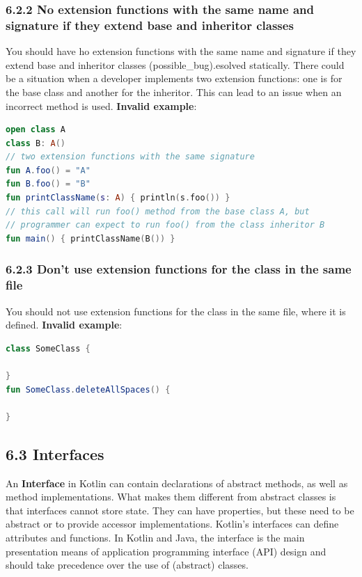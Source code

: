 \subsubsection*{\textbf{6.2.2 No extension functions with the same name and signature if they extend base and inheritor classes}}
\leavevmode\newline
\label{sec:6.2.2}
You should have ho extension functions with the same name and signature if they extend base and inheritor classes (possible\_bug).esolved statically. There could be a situation when a developer implements two extension functions: one is for the base class and another for the inheritor.
This can lead to an issue when an incorrect method is used.
\textbf{Invalid example}:
\begin{lstlisting}[language=Kotlin]
open class A
class B: A()
// two extension functions with the same signature
fun A.foo() = "A"
fun B.foo() = "B"
fun printClassName(s: A) { println(s.foo()) }
// this call will run foo() method from the base class A, but
// programmer can expect to run foo() from the class inheritor B
fun main() { printClassName(B()) }
\end{lstlisting}
\subsubsection*{\textbf{6.2.3 Don't use extension functions for the class in the same file}}
\leavevmode\newline
\label{sec:6.2.3}
You should not use extension functions for the class in the same file, where it is defined.
\textbf{Invalid example}:
\begin{lstlisting}[language=Kotlin]
class SomeClass {
    
}
fun SomeClass.deleteAllSpaces() {
    
}
\end{lstlisting}
\subsection*{\textbf{6.3 Interfaces}}
\label{sec:6.3}
An \textbf{Interface} in Kotlin can contain declarations of abstract methods, as well as method implementations. What makes them different from abstract classes is that interfaces cannot store state.
They can have properties, but these need to be abstract or to provide accessor implementations.
Kotlin's interfaces can define attributes and functions.
In Kotlin and Java, the interface is the main presentation means of application programming interface (API) design and should take precedence over the use of (abstract) classes.
